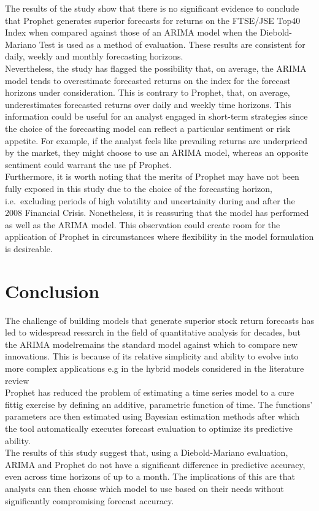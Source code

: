 \documentclass[12pt,a4paper]{article}
\numberwithin{equation}{section}
\numberwithin{figure}{section}
\numberwithin{table}{section}
\begin{document}
The results of the study show that there is no significant evidence to
conclude that Prophet generates superior forecasts for returns on the
FTSE/JSE Top40 Index when compared against those of an ARIMA model when
the Diebold-Mariano Test is used as a method of evaluation. These
results are consistent for daily, weekly and monthly forecasting
horizons.\\
Nevertheless, the study has flagged the possibility that, on average,
the ARIMA model tends to overestimate forecasted returns on the index
for the forecast horizons under consideration. This is contrary to
Prophet, that, on average, underestimates forecasted returns over daily
and weekly time horizons. This information could be useful for an
analyst engaged in short-term strategies since the choice of the
forecasting model can reflect a particular sentiment or risk appetite.
For example, if the analyst feels like prevailing returns are
underpriced by the market, they might choose to use an ARIMA model,
whereas an opposite sentiment could warrant the use pf Prophet.\\
Furthermore, it is worth noting that the merits of Prophet may have not
been fully exposed in this study due to the choice of the forecasting
horizon, i.e.~excluding periods of high volatility and uncertainity
during and after the 2008 Financial Crisis. Nonetheless, it is
reassuring that the model has performed as well as the ARIMA model. This
observation could create room for the application of Prophet in
circumstances where flexibility in the model formulation is desireable.

\section{Conclusion}\label{conclusion}

The challenge of building models that generate superior stock return
forecasts has led to widespread research in the field of quantitative
analysis for decades, but the ARIMA modelremains the standard model
against which to compare new innovations. This is because of its
relative simplicity and ability to evolve into more complex applications
e.g in the hybrid models considered in the literature review\\
Prophet has reduced the problem of estimating a time series model to a
cure fittig exercise by defining an additive, parametric function of
time. The functions' parameters are then estimated using Bayesian
estimation methods after which the tool automatically executes forecast
evaluation to optimize its predictive ability.\\
The results of this study suggest that, using a Diebold-Mariano
evaluation, ARIMA and Prophet do not have a significant difference in
predictive accuracy, even across time horizons of up to a month. The
implications of this are that analysts can then chosse which model to
use based on their needs without significantly compromising forecast
accuracy.
\end{document}

